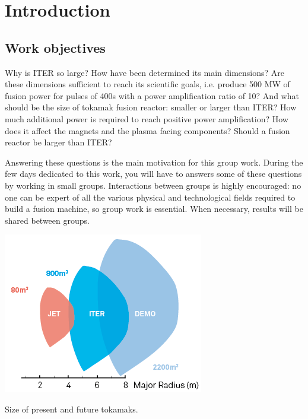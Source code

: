 \section{Introduction}
\subsection{Work objectives}
Why is ITER so large? How have been determined its main dimensions? Are these dimensions sufficient to reach its scientific goals,  i.e. produce 500 MW of fusion power for pulses of 400s with a power amplification ratio of 10? And what should be the size of tokamak fusion reactor: smaller or larger than ITER? How much additional power is required to reach positive power amplification? How does it affect the magnets and the plasma facing components? Should a fusion reactor be larger than ITER?

Answering these questions is the main motivation for this group work. During the few days dedicated to this work, you will have to answers some of these questions by working in small groups. Interactions between groups is highly encouraged: no one can be expert of all the various physical and technological fields required to build a fusion machine, so group work is essential. When necessary, results will be shared between groups.

\begin{marginfigure}[-3.8cm]
	\centering
	\includegraphics[width=1\linewidth]{figures/size_JET_ITER_DEMO}
	\caption{Size of present and future tokamaks.}
	\label{fig:sizejetiterdemo}
\end{marginfigure}

